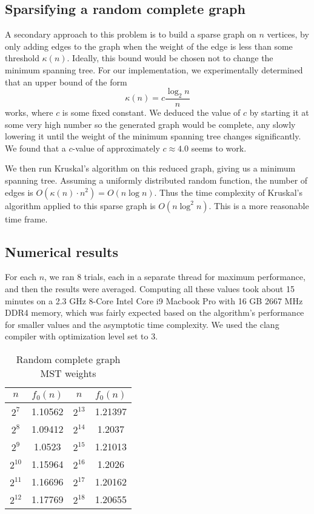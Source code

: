 \documentclass[a4paper, 10pt, twocolumn, twoside]{article}
\begin{document}
\subsection{Sparsifying a random complete graph}

A secondary approach to this problem is to build a sparse graph on $n$ vertices, by only adding edges to the graph when the weight of the edge is less than some threshold $\kappa(n)$. Ideally, this bound would be chosen not to change the minimum spanning tree. For our implementation, we experimentally determined that an upper bound of the form
\[
    \kappa(n)=c\frac{\log_2 n}{n}
\]
works, where $c$ is some fixed constant. We deduced the value of $c$ by starting it at some very high number so the generated graph would be complete, any slowly lowering it until the weight of the minimum spanning tree changes significantly. We found that a $c$-value of approximately $c\approx 4.0$ seems to work.

We then run Kruskal's algorithm on this reduced graph, giving us a minimum spanning tree. Assuming a uniformly distributed random function, the number of edges is $O(\kappa(n)\cdot n^2)=O(n\log n)$. Thus the time complexity of Kruskal's algorithm applied to this sparse graph is $O(n\log^2 n)$. This is a more reasonable time frame. 

\subsection{Numerical results}

For each $n$, we ran $8$ trials, each in a separate thread for maximum performance, and then the results were averaged. Computing all these values took about 15 minutes on a 2.3 GHz 8-Core Intel Core i9 Macbook Pro
with 16 GB 2667 MHz DDR4 memory, which was fairly expected based on the algorithm's performance for smaller values and the asymptotic time complexity. We used the clang compiler with optimization level set to 3.

\renewcommand{\arraystretch}{1.5}
\begin{table}[htbp]
\centering
\caption{Random complete graph MST weights}
\begin{tabular}{||c|c||c|c||}
\hline
$n$ & $f_0(n)$ & $n$ & $f_0(n)$ \\
\hline
$2^7$ &1.10562 & $2^{13}$  &1.21397\\
$2^8$	&1.09412 & $2^{14}$  &1.2037\\
$2^9$&1.0523 &$2^{15}$  &1.21013\\
$2^{10}$ &1.15964 &$2^{16}$  &1.2026\\
$2^{11}$  &1.16696 & $2^{17}$  &1.20162\\
$2^{12}$  &1.17769 & $2^{18}$  &1.20655\\
\hline
\end{tabular}
\end{table}
\end{document}
